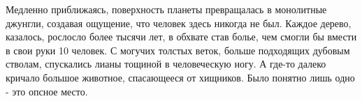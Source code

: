 Медленно приближаясь, поверхность планеты превращалась в монолитные джунгли, создавая ощущение, что человек здесь никогда не был. Каждое дерево, казалось, рослосло более тысячи лет, в обхвате став болье, чем смогли бы вмести в свои руки 10 человек. С могучих толстых веток, больше подходящих дубовым стволам, спускались лианы тощиной в человеческую ногу. А где-то далеко кричало большое животное, спасающееся от хищников. Было понятно лишь одно - это опсное место. 